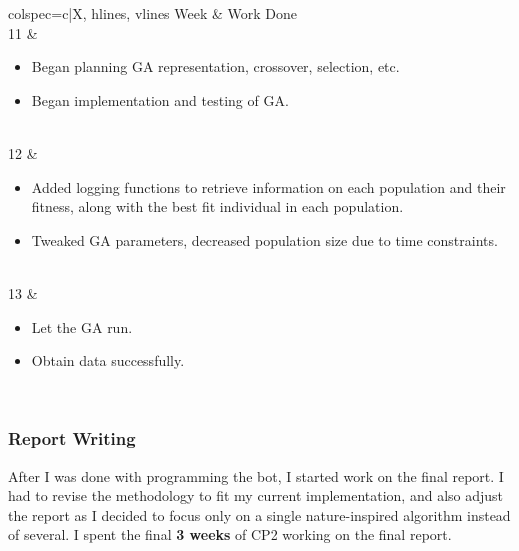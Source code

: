 \documentclass[a4paper, 12pt]{extreport}
\begin{document}
			\begin{longtblr}[
				caption = Weekly breakdown of work done for the GA implementation.
				]{colspec={c|X}, hlines, vlines}
				Week & Work Done \\
				11 & \begin{varwidth}[t]{\linewidth}
					\begin{itemize}[topsep=0pt,parsep=0pt]
						\item Began planning GA representation, crossover, selection, etc.
						\item Began implementation and testing of GA.
					\end{itemize}
				\end{varwidth}\\
				12 & \begin{varwidth}[t]{\linewidth}
					\begin{itemize}[topsep=0pt,parsep=0pt]
						\item Added logging functions to retrieve information on each population and their fitness, along with the best fit individual in each population.
						\item Tweaked GA parameters, decreased population size due to time constraints.
					\end{itemize}
				\end{varwidth}\\
				13 & \begin{varwidth}[t]{\linewidth}
					\begin{itemize}[topsep=0pt,parsep=0pt]
						\item Let the GA run.
						\item Obtain data successfully.
					\end{itemize}
				\end{varwidth}\\
			\end{longtblr}
		
		\subsubsection{Report Writing}
		
			After I was done with programming the bot, I started work on the final report. I had to revise the methodology to fit my current implementation, and also adjust the report as I decided to focus only on a single nature-inspired algorithm instead of several. I spent the final \textbf{3 weeks} of CP2 working on the final report.
		
\end{document}
